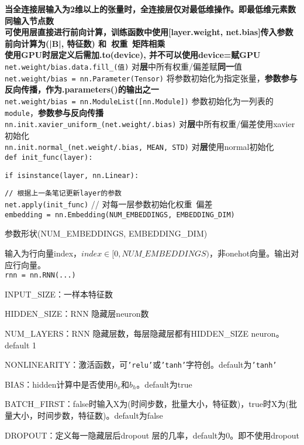 \documentclass[UTF8]{ctexart}
\begin{document}
  \quad \textbf{当全连接层输入为2维以上的张量时，全连接层仅对最低维操作。即最低维元素数同输入节点数}\\
\textbf{可使用层直接进行前向计算，训练函数中使用[layer.weight, net.bias]传入参数}\\
\textbf{前向计算为(|B|, 特征数) 和\ 权重\ 矩阵相乘}\\
\textbf{使用GPU时层定义后需加.to(device), 并不可以使用device=赋GPU}\\
\texttt{net.weight/bias.data.fill\_(值)} 对\textbf{层}中所有权重/偏差赋\textbf{同一}值\\
\texttt{net.weight/bias = nn.Parameter(Tensor)} 将参数初始化为指定张量，\textbf{参数参与反向传播，作为.parameters()的输出之一}\\
\texttt{net.weight/bias = nn.ModuleList([nn.Module])} 参数初始化为一列表的\texttt{module}，\textbf{参数参与反向传播}\\
\texttt{nn.init.xavier\_uniform\_(net.weight/.bias)} 对\textbf{层}中所有权重/偏差使用xavier初始化\\
\texttt{nn.init.normal\_(net.weight/.bias, MEAN, STD)} 对\textbf{层}使用normal初始化\\
\texttt{def init\_func(layer):}

  \texttt{if isinstance(layer, nn.Linear):}

  \quad \texttt{// 根据上一条笔记更新layer的参数}\\
\texttt{net.apply(init\_func)} // 对每一层参数初始化权重\ 偏差\\
\texttt{embedding = nn.Embedding(NUM\_EMBEDDINGS, EMBEDDING\_DIM)}

  参数形状(NUM\_EMBEDDINGS, EMBEDDING\_DIM)
  
  输入为行向量index，$index \in [0, NUM\_EMBEDDINGS)$，非onehot向量。输出对应行向量。\\
\texttt{rnn = nn.RNN(...)}
  
  INPUT\_SIZE：一样本特征数
  
  HIDDEN\_SIZE：RNN 隐藏层neuron数
  
  NUM\_LAYERS：RNN 隐藏层数，每层隐藏层都有HIDDEN\_SIZE neuron。default 1
  
  NONLINEARITY：激活函数，可\texttt{'relu'}或\texttt{'tanh'}字符创。default为\texttt{'tanh'}

  BIAS：hidden计算中是否使用$b_x$和$b_h$。default为true

  BATCH\_FIRST：false时输入X为(时间步数，批量大小，特征数)，true时X为(批量大小，时间步数，特征数)。default为false

  DROPOUT：定义每一隐藏层后dropout 层的几率，default为0。即不使用dropout
\end{document}
